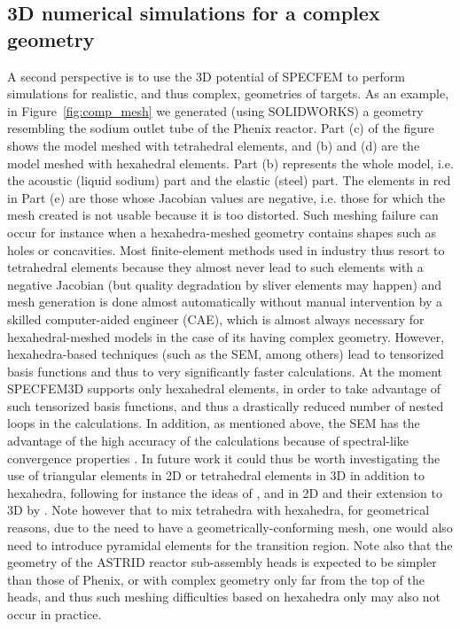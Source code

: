 \clearpage
\subsection*{3D numerical simulations for a complex geometry}

A second perspective is to use the 3D potential of SPECFEM to perform simulations for realistic, and thus complex, geometries of targets.
As an example, in Figure~\ref{fig:comp_mesh}  we generated (using SOLIDWORKS) a geometry resembling the sodium outlet tube of the Phenix reactor.
 Part (c) of the figure shows the model meshed with tetrahedral elements, and (b) and (d) are the model meshed with hexahedral elements.
 Part (b) represents the whole model, i.e. the acoustic (liquid sodium) part and the elastic (steel) part.
 The elements in red in Part (e) are those whose Jacobian values are negative, i.e. those for which the mesh created is not usable because it is too distorted.
 Such meshing failure can occur for instance when a hexahedra-meshed geometry contains shapes such as holes or concavities.
 Most finite-element methods used in industry thus resort to tetrahedral elements because they almost never lead to such elements with a negative Jacobian (but quality degradation by sliver elements may happen) and mesh generation is done almost automatically without manual intervention by a skilled computer-aided engineer (CAE),
 which is almost always necessary for hexahedral-meshed models in the case of its having complex geometry.
However, hexahedra-based techniques (such as the SEM, among others) lead to tensorized basis functions and thus to very significantly faster calculations.
 At the moment SPECFEM3D supports only hexahedral elements, in order to take advantage of such tensorized basis functions, and thus a drastically reduced number of nested
loops in the calculations.
 In addition, as mentioned above, the SEM has the advantage of the high accuracy of the calculations because of spectral-like convergence properties \parencite{KoMaTrTaWi01}.
In future work it could thus be worth investigating the use of triangular elements in 2D or tetrahedral elements in 3D in addition to hexahedra,
following for instance the ideas of \cite{Dub93}, \cite{KoMaTrTaWi01} and \cite{PaRa04} in 2D and their extension to 3D by \cite{ShKarn95}.
Note however that to mix tetrahedra with hexahedra, for geometrical reasons, due to the need to have a geometrically-conforming mesh, one would also need to introduce pyramidal
elements for the transition region.
Note also that the geometry of the ASTRID reactor sub-assembly heads is expected to be simpler than those of Phenix,
or with complex geometry only far from the top of the heads, and thus such meshing difficulties based on hexahedra only may also not occur in practice.

